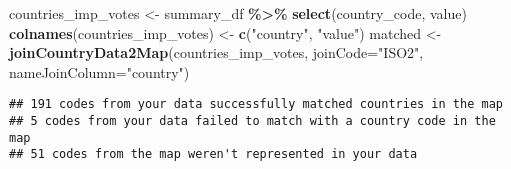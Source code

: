 \documentclass[
]{article}
\newenvironment{Shaded}{\begin{snugshade}}{\end{snugshade}}
\newcommand{\DataTypeTok}[1]{\textcolor[rgb]{0.13,0.29,0.53}{#1}}
\newcommand{\KeywordTok}[1]{\textcolor[rgb]{0.13,0.29,0.53}{\textbf{#1}}}
\newcommand{\NormalTok}[1]{#1}
\newcommand{\OperatorTok}[1]{\textcolor[rgb]{0.81,0.36,0.00}{\textbf{#1}}}
\newcommand{\StringTok}[1]{\textcolor[rgb]{0.31,0.60,0.02}{#1}}
\begin{document}
\begin{Shaded}
\begin{Highlighting}[]
\NormalTok{countries\_imp\_votes \textless{}{-}}\StringTok{ }\NormalTok{summary\_df }\OperatorTok{\%\textgreater{}\%}
\StringTok{  }\KeywordTok{select}\NormalTok{(country\_code, value) }
\KeywordTok{colnames}\NormalTok{(countries\_imp\_votes) \textless{}{-}}\StringTok{ }\KeywordTok{c}\NormalTok{(}\StringTok{"country"}\NormalTok{, }\StringTok{"value"}\NormalTok{)}
\NormalTok{matched \textless{}{-}}\StringTok{ }\KeywordTok{joinCountryData2Map}\NormalTok{(countries\_imp\_votes, }\DataTypeTok{joinCode=}\StringTok{"ISO2"}\NormalTok{, }\DataTypeTok{nameJoinColumn=}\StringTok{"country"}\NormalTok{)}
\end{Highlighting}
\end{Shaded}

\begin{verbatim}
## 191 codes from your data successfully matched countries in the map
## 5 codes from your data failed to match with a country code in the map
## 51 codes from the map weren't represented in your data
\end{verbatim}
\end{document}
